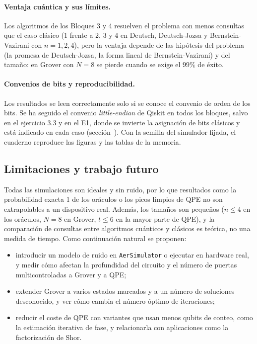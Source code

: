 \paragraph{Ventaja cuántica y sus límites.} Los algoritmos de los Bloques 3 y 4 resuelven el problema con menos consultas que el caso clásico (1 frente a 2, 3 y 4 en Deutsch, Deutsch-Jozsa y Bernstein-Vazirani con $n=1,2,4$),
pero la ventaja depende de las hipótesis del problema (la promesa de Deutsch-Jozsa, la forma lineal de Bernstein-Vazirani) y del tamaño: en Grover con $N=8$ se pierde cuando se exige el $99\%$ de éxito.

\paragraph{Convenios de bits y reproducibilidad.} Los resultados se leen correctamente solo si se conoce el convenio de orden de los bits. Se ha seguido el convenio \textit{little-endian} de Qiskit en todos los bloques, salvo en el ejercicio 3.3 y en el E1,
donde se invierte la asignación de bits clásicos y está indicado en cada caso (sección~). Con la semilla del simulador fijada, el cuaderno reproduce las figuras y las tablas de la memoria.

\subsection{Limitaciones y trabajo futuro}

Todas las simulaciones son ideales y sin ruido, por lo que resultados como la probabilidad exacta 1 de los oráculos o los picos limpios de QPE no son extrapolables a un dispositivo real.
Además, los tamaños son pequeños ($n\le4$ en los oráculos, $N=8$ en Grover, $t\le6$ en la mayor parte de QPE), y la comparación de consultas entre algoritmos cuánticos y clásicos es teórica, no una medida de tiempo.
Como continuación natural se proponen:
\begin{itemize}
    \item introducir un modelo de ruido en \texttt{AerSimulator} o ejecutar en hardware real, y medir cómo afectan la profundidad del circuito y el número de puertas multicontroladas a Grover y a QPE;
    \item extender Grover a varios estados marcados y a un número de soluciones desconocido, y ver cómo cambia el número óptimo de iteraciones;
    \item reducir el coste de QPE con variantes que usan menos qubits de conteo, como la estimación iterativa de fase, y relacionarla con aplicaciones como la factorización de Shor.
\end{itemize}

